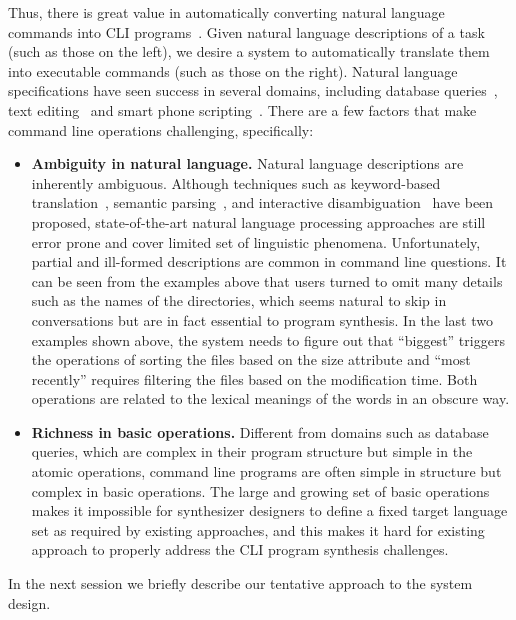 Thus, there is great value in automatically converting natural language commands into CLI programs~\cite{Pedersen-Report,zoltan1991get,Manaris:1994:DNL:198125.198137}.
Given natural language descriptions of a task (such as those on the left), we desire a system to automatically translate them into executable commands (such as those on the right).
Natural language specifications have seen success in several domains, including database queries~\cite{DBLP:journals/pvldb/LiJ14, DBLP:conf/sigmod/GulwaniM14}, text editing~\cite{DBLP:journals/corr/DesaiGHJKMRR15} and smart phone scripting~\cite{DBLP:conf/mobisys/LeGS13}.
There are a few factors that make command line operations challenging, specifically:
\begin{itemize}
\item \textbf{Ambiguity in natural language.} Natural language descriptions are inherently ambiguous. Although techniques such as keyword-based translation~\cite{DBLP:conf/sigmod/GulwaniM14}, semantic parsing~\citep{Zettlemoyer05learningto}, and interactive disambiguation~\cite{DBLP:journals/pvldb/LiJ14} have been proposed, state-of-the-art natural language processing approaches are still error prone and cover limited set of linguistic phenomena.
Unfortunately, partial and ill-formed descriptions are common in command line questions. It can be seen from the examples above that users turned to omit many details such as the names of the directories, which seems natural to skip in conversations but are in fact essential to program synthesis. In the last two examples shown above, the system needs to figure out that ``biggest'' triggers the operations of sorting the files based on the size attribute and ``most recently'' requires filtering the files based on the modification time. Both operations are related to the lexical meanings of the words in an obscure way.

\item \textbf{Richness in basic operations.} Different from domains such as database queries, which are complex in their program structure but simple in the atomic operations, command line programs are often simple in structure but complex in basic operations. The large and growing set of basic operations makes it impossible for synthesizer designers to define a fixed target language set as required by existing approaches, and this makes it hard for existing approach to properly address the CLI program synthesis challenges.
\end{itemize}

In the next session we briefly describe our tentative approach to the system design.

